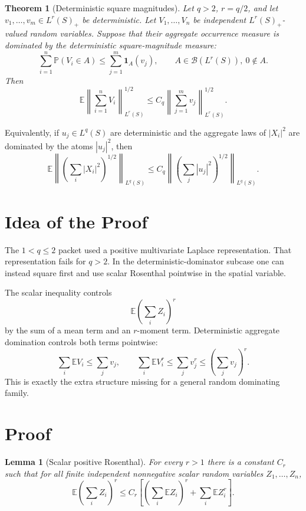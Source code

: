 \documentclass[11pt]{article}
\newtheorem{theorem}{Theorem}
\newtheorem{lemma}{Lemma}
\newcommand{\E}{\mathbb E}
\newcommand{\Pp}{\mathbb P}
\newcommand{\cB}{\mathcal B}
\newcommand{\norm}[1]{\left\lVert #1\right\rVert}
\begin{document}
\begin{theorem}[Deterministic square magnitudes]
\label{thm:det}
Let \(q>2\), \(r=q/2\), and let \(v_1,\ldots,v_m\in L^r(S)_+\) be
deterministic.  Let \(V_1,\ldots,V_n\) be independent \(L^r(S)_+\)-valued
random variables.  Suppose that their aggregate occurrence measure is
dominated by the deterministic square-magnitude measure:
\[
  \sum_{i=1}^n \Pp(V_i\in A)
  \le
  \sum_{j=1}^m \mathbf 1_A(v_j),
  \qquad A\in \cB(L^r(S)),\ 0\notin A.
\]
Then
\[
  \E\norm{\sum_{i=1}^n V_i}_{L^r(S)}^{1/2}
  \le
  C_q
  \norm{\sum_{j=1}^m v_j}_{L^r(S)}^{1/2}.
\]
\end{theorem}

Equivalently, if \(u_j\in L^q(S)\) are deterministic and the aggregate laws
of \(|X_i|^2\) are dominated by the atoms \(|u_j|^2\), then
\[
  \E\left\|
      \left(\sum_i |X_i|^2\right)^{1/2}
    \right\|_{L^q(S)}
  \le C_q
  \left\|
      \left(\sum_j |u_j|^2\right)^{1/2}
    \right\|_{L^q(S)}.
\]

\section*{Idea of the Proof}

The \(1<q\le2\) packet used a positive multivariate Laplace representation.
That representation fails for \(q>2\).  In the deterministic-dominator
subcase one can instead square first and use scalar Rosenthal pointwise in
the spatial variable.

The scalar inequality controls
\[
  \E\left(\sum_i Z_i\right)^r
\]
by the sum of a mean term and an \(r\)-moment term.  Deterministic aggregate
domination controls both terms pointwise:
\[
  \sum_i \E V_i \le \sum_j v_j,
  \qquad
  \sum_i \E V_i^r \le \sum_j v_j^r\le\left(\sum_j v_j\right)^r.
\]
This is exactly the extra structure missing for a general random dominating
family.

\section*{Proof}

\begin{lemma}[Scalar positive Rosenthal]
\label{lem:scalar}
For every \(r>1\) there is a constant \(C_r\) such that for all finite
independent nonnegative scalar random variables \(Z_1,\ldots,Z_n\),
\[
  \E\left(\sum_i Z_i\right)^r
  \le
  C_r\left[
      \left(\sum_i \E Z_i\right)^r
      +
      \sum_i \E Z_i^r
    \right].
\]
\end{lemma}
\end{document}
